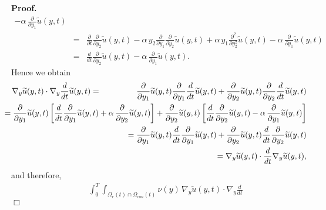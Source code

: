 \documentclass[12pt]{article}
\newenvironment{proof}{\textbf{Proof.}}{\hfill $\Box$}
\numberwithin{equation}{section}
\begin{document}
\begin{proof}
\begin{eqnarray*}
          - \alpha \, \frac{\partial}{\partial y_1}
          \widetilde{u}(y,t) \\
    & = & \frac{\partial}{\partial t} \frac{\partial}{\partial y_2} 
          \widetilde{u}(y,t) -
          \alpha \, y_2 \frac{\partial}{\partial y_1}
          \frac{\partial}{\partial y_2}\widetilde{u}(y,t)
          + \alpha \, y_1 \frac{\partial^2}{\partial y_2^2}
          \widetilde{u}(y,t)
          - \alpha \, \frac{\partial}{\partial y_1}
          \widetilde{u}(y,t) \\
    & = & \frac{d}{dt} \frac{\partial}{\partial y_2}
          \widetilde{u}(y,t)
          - \alpha \, \frac{\partial}{\partial y_1}
          \widetilde{u}(y,t) .
  \end{eqnarray*}
  Hence we obtain
  \begin{eqnarray*}
    \nabla_y \widetilde{u}(y,t) \cdot
    \nabla_y \frac{d}{dt} \widetilde{u}(y,t)
    & = & \frac{\partial}{\partial y_1} \widetilde{u}(y,t)
          \frac{\partial}{\partial y_1} \frac{d}{dt}
          \widetilde{u}(y,t) +
          \frac{\partial}{\partial y_2} \widetilde{u}(y,t)
          \frac{\partial}{\partial y_2} \frac{d}{dt}
          \widetilde{u}(y,t) \\
    && \hspace*{-4.5cm} =
       \frac{\partial}{\partial y_1} \widetilde{u}(y,t)
       \left[ \frac{d}{dt} \frac{\partial}{\partial y_1}
       \widetilde{u}(y,t)
       + \alpha \, \frac{\partial}{\partial y_2}
       \widetilde{u}(y,t) \right]
       + \frac{\partial}{\partial y_2} \widetilde{u}(y,t)
       \left[ \frac{d}{dt} \frac{\partial}{\partial y_2}
       \widetilde{u}(y,t)
       - \alpha \, \frac{\partial}{\partial y_1}
       \widetilde{u}(y,t) \right] \\
    && \hspace*{-4.5cm} =
       \frac{\partial}{\partial y_1} \widetilde{u}(y,t) 
       \frac{d}{dt} \frac{\partial}{\partial y_1}
       \widetilde{u}(y,t)
       + \frac{\partial}{\partial y_2} \widetilde{u}(y,t) 
       \frac{d}{dt} \frac{\partial}{\partial y_2}
       \widetilde{u}(y,t) \\
    && \hspace*{-4.5cm} =
       \nabla_y \widetilde{u}(y,t) \cdot \frac{d}{dt}
       \nabla_y \widetilde{u}(y,t),
  \end{eqnarray*}
  and therefore,
  \begin{eqnarray*}
    && \int_0^T \int_{\Omega_r(t) \cap\Omega_{con}(t)} \nu(y) \, \nabla_y
       \widetilde{u}(y,t) \cdot \nabla_y \frac{d}{dt} 

\end{eqnarray*}
\end{proof}
\end{document}
